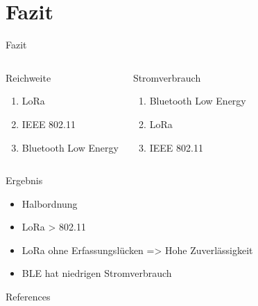 \documentclass[18pt]{beamer}
\begin{document}
\section{Fazit}
\begin{frame}{Fazit}
	\begin{columns}
			\begin{block}{Reichweite}
				\begin{enumerate}
					\item LoRa
					\item IEEE 802.11
					\item Bluetooth Low Energy
				\end{enumerate}
			\end{block}

			\begin{block}{Stromverbrauch}
				\begin{enumerate}
					\item Bluetooth Low Energy
					\item LoRa
					\item IEEE 802.11
				\end{enumerate}
			\end{block}
	\end{columns}

	\begin{block}{Ergebnis}
			\begin{itemize}
				\item Halbordnung
				\item LoRa > 802.11
				\item LoRa ohne Erfassungslücken => Hohe Zuverlässigkeit
				\item BLE hat niedrigen Stromverbrauch
			\end{itemize}
	\end{block}

\end{frame}


\appendix
\beginbackup

\begin{frame}[allowframebreaks]{References}
\printbibliography
\end{frame}

\backupend
\end{document}

